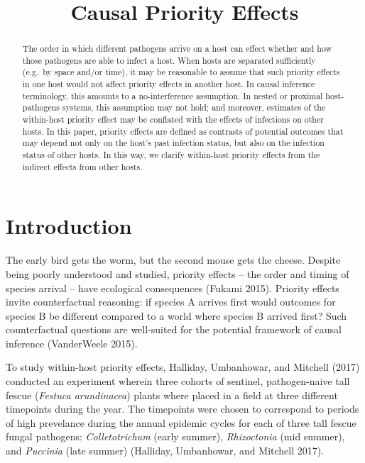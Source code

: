 \documentclass[]{article}
\title{Causal Priority Effects}
\author{}
\date{}
\begin{document}
\maketitle
\begin{abstract}
\noindent The order in which different pathogens arrive on a host can
effect whether and how those pathogens are able to infect a host. When
hosts are separated sufficiently (e.g.~by space and/or time), it may be
reasonable to assume that such priority effects in one host would not
affect priority effects in another host. In causal inference
terminology, this amounts to a no-interference assumption. In nested or
proximal host-pathogens systems, this assumption may not hold; and
moreover, estimates of the within-host priority effect may be conflated
with the effects of infections on other hosts. In this paper, priority
effects are defined as contrasts of potential outcomes that may depend
not only on the host's past infection status, but also on the infection
status of other hosts. In this way, we clarify within-host priority
effects from the indirect effects from other hosts.
\end{abstract}

\doublespacing

\hypertarget{introduction}{%
\section{Introduction}\label{introduction}}

The early bird gets the worm, but the second mouse gets the cheese.
Despite being poorly understood and studied, priority effects -- the
order and timing of species arrival -- have ecological consequences
(Fukami 2015). Priority effects invite counterfactual reasoning: if
species A arrives first would outcomes for species B be different
compared to a world where species B arrived first? Such counterfactual
questions are well-suited for the potential framework of causal
inference (VanderWeele 2015).

To study within-host priority effects, Halliday, Umbanhowar, and
Mitchell (2017) conducted an experiment wherein three cohorts of
sentinel, pathogen-naive tall fescue (\emph{Festuca arundinacea}) plants
where placed in a field at three different timepoints during the year.
The timepoints were chosen to correspond to periods of high prevelance
during the annual epidemic cycles for each of three tall fescue fungal
pathogens: \emph{Colletotrichum} (early summer), \emph{Rhizoctonia} (mid
summer), and \emph{Puccinia} (late summer) (Halliday, Umbanhowar, and
Mitchell 2017).
\end{document}
